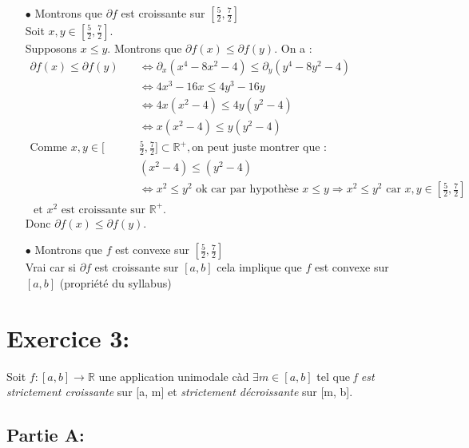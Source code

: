 \documentclass[a4paper, 12pt]{article}
\begin{document}
\begin{itemize}
	\item[$\bullet$] Montrons que $\partial f $ est croissante sur $[\frac{5}{2},\frac{7}{2}]$\\
		Soit $x,y \in [\frac{5}{2},\frac{7}{2}]$.\\
		Supposons $x \leqslant y$.
		Montrons que $\partial f(x) \leqslant \partial f(y)$.
		On a :
		\begin{align*}
		\partial f(x) \leqslant \partial f(y)& \Leftrightarrow \partial_x (x^4-8x^2-4) \leqslant \partial_y (y^4-8y^2-4)\\
		& \Leftrightarrow 4x^3-16x \leqslant 4y^3-16y\\
		& \Leftrightarrow 4x(x^2-4)\leqslant 4y(y^2-4)\\
		& \Leftrightarrow x(x^2-4) \leqslant y(y^2-4)\\
		\text{Comme }x,y\in[&\frac{5}{2},\frac{7}{2}]\subset\mathbb{R}^+,\text{on peut juste montrer que :} \\
		&(x^2-4) \leqslant (y^2-4)\\
		&\Leftrightarrow x^2\leqslant y^2 \text{ ok car par hypothèse } x\leqslant y \Rightarrow x^2 \leqslant y^2 \text{ car } x,y\in [\frac{5}{2},\frac{7}{2}] \\ \text{ et } x^2 \text{ est croissante sur  }\mathbb{R}^+.
		\end{align*}
	Donc $\partial f(x) \leqslant \partial f(y)$.
	\item[$\bullet$] Montrons que $f$ est convexe sur $[\frac{5}{2},\frac{7}{2}]$\\
	Vrai car si $\partial f$ est croissante sur $[a,b]$ cela implique que $f$ est convexe sur $[a,b]$ (propriété du syllabus)
\end{itemize}

\section{Exercice 3:}

Soit \( f : [a, b] \rightarrow \mathbb{R} \) une application unimodale càd \( \exists m \in [a, b] \) tel que \emph{f est strictement croissante} sur [a, m] et \emph{strictement décroissante} sur [m, b].

\subsection{Partie A:}
\end{document}
